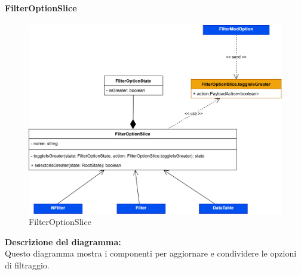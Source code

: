 \pagebreak

\paragraph{FilterOptionSlice}
\begin{figure}[h!] \centering
      \includegraphics[scale=0.18]{template/images/uml_front/logic/FilterOptionSlice.png}
      \caption{FilterOptionSlice}
\end{figure}
\textbf{Descrizione del diagramma:}\\
Questo diagramma mostra i componenti per aggiornare e condividere le opzioni di filtraggio.

